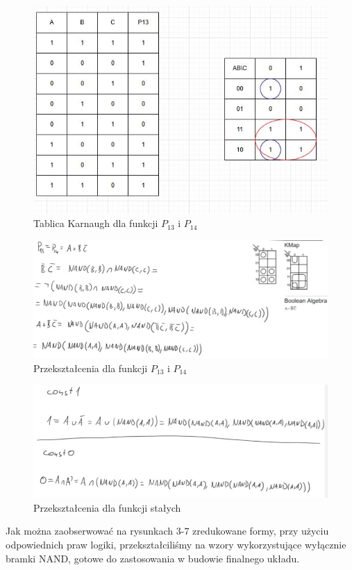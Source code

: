 \documentclass[11pt]{article}
\begin{document}
\begin{figure}[H]
\centering
\includegraphics[width=.9\linewidth]{../../CW0POPRW/P13.JPG}
\caption{Tablica Karnaugh dla funkcji \(P_{13}\) i \(P_{14}\)}
\end{figure}
\begin{figure}[H]
\centering
\includegraphics[width=.9\linewidth]{p13p14.jpg}
\caption{Przekształcenia dla funkcji \(P_{13}\) i \(P_{14}\)}
\end{figure}

\begin{figure}[H]
\centering
\includegraphics[width=.9\linewidth]{const.jpg}
\caption{Przekształcenia dla funkcji stałych}
\end{figure}

Jak można zaobserwować na rysunkach 3-7 zredukowane formy, przy użyciu odpowiednich praw logiki, przekształciliśmy na wzory
wykorzystujące wyłącznie bramki NAND, gotowe do zastosowania w budowie finalnego układu.
\end{document}
